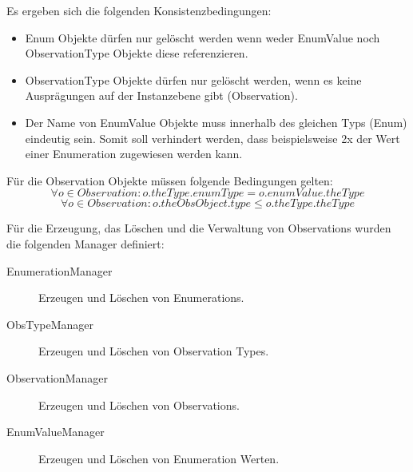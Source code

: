 Es ergeben sich die folgenden Konsistenzbedingungen:
\begin{itemize}
  \item Enum Objekte dürfen nur gelöscht werden wenn weder EnumValue noch ObservationType Objekte diese referenzieren.
  \item ObservationType Objekte dürfen nur gelöscht werden, wenn es keine Ausprägungen auf der Instanzebene gibt (Observation).
  \item Der Name von EnumValue Objekte muss innerhalb des gleichen Typs (Enum) eindeutig sein. Somit soll verhindert werden, dass beispielsweise 2x der Wert  einer Enumeration  zugewiesen werden kann.
\end{itemize}

Für die Observation Objekte müssen folgende Bedingungen gelten:
\begin{equation}\forall o \in Observation: o.theType.enumType = o.enumValue.theType
\end{equation}
\begin{equation}\forall o \in Observation: o.theObsObject.type \leq o.theType.theType
\end{equation}

Für die Erzeugung, das Löschen und die Verwaltung von Observations wurden die folgenden Manager definiert:
\begin{description}
\item[EnumerationManager] Erzeugen und Löschen von Enumerations.
\item[ObsTypeManager] Erzeugen und Löschen von Observation Types.
\item[ObservationManager] Erzeugen und Löschen von Observations.
\item[EnumValueManager] Erzeugen und Löschen von Enumeration Werten.
\end{description}
